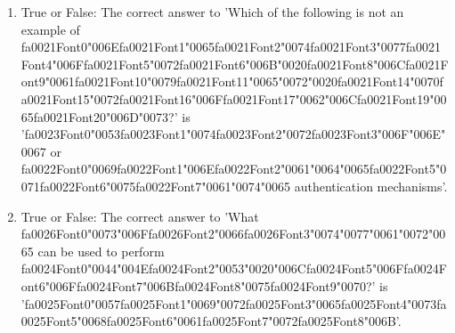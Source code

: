 \documentclass[12pt]{article}
\begin{document}
\begin{enumerate}[label=\arabic*.]
\item True or False: The correct answer to 'Which of the following is not an example of {\csname fa0021Font0\endcsname\char"006E}{\csname fa0021Font1\endcsname\char"0065}{\csname fa0021Font2\endcsname\char"0074}{\csname fa0021Font3\endcsname\char"0077}{\csname fa0021Font4\endcsname\char"006F}{\csname fa0021Font5\endcsname\char"0072}{\csname fa0021Font6\endcsname\char"006B}{\char"0020}{\csname fa0021Font8\endcsname\char"006C}{\csname fa0021Font9\endcsname\char"0061}{\csname fa0021Font10\endcsname\char"0079}{\csname fa0021Font11\endcsname\char"0065}{\char"0072}{\char"0020}{\csname fa0021Font14\endcsname\char"0070}{\csname fa0021Font15\endcsname\char"0072}{\csname fa0021Font16\endcsname\char"006F}{\csname fa0021Font17\endcsname\char"0062}{\char"006C}{\csname fa0021Font19\endcsname\char"0065}{\csname fa0021Font20\endcsname\char"006D}{\char"0073}?' is '{\csname fa0023Font0\endcsname\char"0053}{\csname fa0023Font1\endcsname\char"0074}{\csname fa0023Font2\endcsname\char"0072}{\csname fa0023Font3\endcsname\char"006F}{\char"006E}{\char"0067} or {\csname fa0022Font0\endcsname\char"0069}{\csname fa0022Font1\endcsname\char"006E}{\csname fa0022Font2\endcsname\char"0061}{\char"0064}{\char"0065}{\csname fa0022Font5\endcsname\char"0071}{\csname fa0022Font6\endcsname\char"0075}{\csname fa0022Font7\endcsname\char"0061}{\char"0074}{\char"0065} authentication mechanisms'.
\item True or False: The correct answer to 'What {\csname fa0026Font0\endcsname\char"0073}{\char"006F}{\csname fa0026Font2\endcsname\char"0066}{\csname fa0026Font3\endcsname\char"0074}{\char"0077}{\char"0061}{\char"0072}{\char"0065} can be used to perform {\csname fa0024Font0\endcsname\char"0044}{\char"004E}{\csname fa0024Font2\endcsname\char"0053}{\char"0020}{\char"006C}{\csname fa0024Font5\endcsname\char"006F}{\csname fa0024Font6\endcsname\char"006F}{\csname fa0024Font7\endcsname\char"006B}{\csname fa0024Font8\endcsname\char"0075}{\csname fa0024Font9\endcsname\char"0070}?' is '{\csname fa0025Font0\endcsname\char"0057}{\csname fa0025Font1\endcsname\char"0069}{\char"0072}{\csname fa0025Font3\endcsname\char"0065}{\csname fa0025Font4\endcsname\char"0073}{\csname fa0025Font5\endcsname\char"0068}{\csname fa0025Font6\endcsname\char"0061}{\csname fa0025Font7\endcsname\char"0072}{\csname fa0025Font8\endcsname\char"006B}'.

\end{enumerate}
\end{document}
